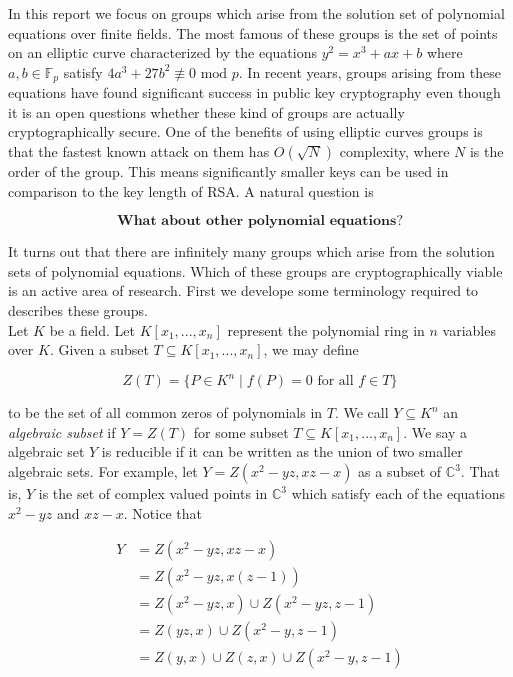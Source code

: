

In this report we focus on groups which arise from the solution set of polynomial equations over finite fields. The most famous of these groups is the set of points on an elliptic curve characterized by the equations $y^2 = x^3 + ax + b$ where $a,b \in \mathbb{F}_p$ satisfy $4a^3 + 27b^2 \not\equiv 0 \text{ mod } p$. In recent years, groups arising from these equations have found significant success in public key cryptography even though it is an open questions whether these kind of groups are actually cryptographically secure. One of the benefits of using elliptic curves groups is that the fastest known attack on them has $O(\sqrt{N})$ complexity, where $N$ is the order of the group. This means significantly smaller keys can be used in comparison to the key length of RSA. A natural question is 

$$
\textbf{What about other polynomial equations?}
$$ 

It turns out that there are infinitely many groups which arise from the solution sets of polynomial equations. Which of these groups are cryptographically viable is an active area of research. First we develope some terminology required to describes these groups. \\ 

Let $K$ be a field. Let $K[x_1,...,x_n]$ represent the polynomial ring in $n$ variables over $K$. Given a subset $T \subseteq K[x_1,...,x_n] $, we may define 

$$
Z(T) = \lbrace P \in K^n \mid f(P) = 0 \text{ for all } f \in T \rbrace 
$$ 

to be the set of all common zeros of polynomials in $T$. We call $Y \subseteq K^n $ an \textit{algebraic subset} if $Y = Z(T)$ for some subset $T \subseteq K[x_1,...,x_n]$. We say a algebraic set $Y$ is reducible if it can be written as the union of two smaller algebraic sets. For example, let $Y = Z(x^2 - yz, xz-x)$ as a subset of $\mathbb{C}^3$. That is, $Y$ is the set of complex valued points in $\mathbb{C}^3$ which satisfy each of the equations $x^2 - yz$ and $xz-x$. Notice that

\begin{align*}
	Y &= Z(x^2 - yz, xz-x) \\
	&= Z(x^2 - yz, x(z-1)) \\
	&= Z(x^2 - yz,x) \cup Z(x^2 - yz,z-1) \\
	&= Z(yz,x) \cup Z(x^2 - y,z -1) \\
	&= Z(y,x) \cup Z(z,x) \cup Z(x^2 - y, z - 1)
\end{align*} 

